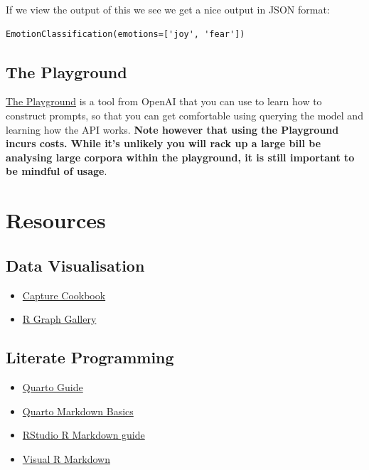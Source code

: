 \documentclass[
  letterpaper,
  DIV=11,
  numbers=noendperiod]{scrreprt}
\providecommand{\tightlist}{%
  \setlength{\itemsep}{0pt}\setlength{\parskip}{0pt}}\usepackage{longtable,booktabs,array}
\begin{document}
If we view the output of this we see we get a nice output in JSON
format:

\begin{verbatim}
EmotionClassification(emotions=['joy', 'fear'])
\end{verbatim}

\section{The Playground}\label{the-playground}

\href{https://platform.openai.com/playground/chat?models=gpt-4o-mini}{The
Playground} is a tool from OpenAI that you can use to learn how to
construct prompts, so that you can get comfortable using querying the
model and learning how the API works. \textbf{Note however that using
the Playground incurs costs. While it's unlikely you will rack up a
large bill be analysing large corpora within the playground, it is still
important to be mindful of usage}.

\chapter{Resources}\label{resources}

\section{Data Visualisation}\label{data-visualisation}

\begin{itemize}
\tightlist
\item
  \href{https://github.com/jamiehshare/capture_cookbook}{Capture
  Cookbook}
\item
  \href{https://r-graph-gallery.com/}{R Graph Gallery}
\end{itemize}

\section{Literate Programming}\label{literate-programming-1}

\begin{itemize}
\tightlist
\item
  \href{https://quarto.org/docs/guide/}{Quarto Guide}
\item
  \href{https://quarto.org/docs/authoring/markdown-basics.html}{Quarto
  Markdown Basics}
\item
  \href{https://rmarkdown.rstudio.com/lesson-1.html}{RStudio R Markdown
  guide}
\item
  \href{https://rstudio.github.io/visual-markdown-editing/\#/}{Visual R
  Markdown}
\end{itemize}
\end{document}
